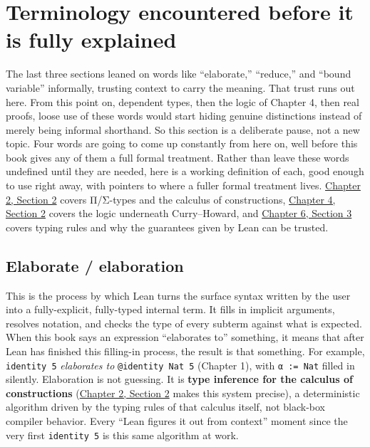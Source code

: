 \section{Terminology encountered before it is fully explained}\label{sec:02-terminology-and-coc:01-terminology:1}

The last three sections leaned on words like ``elaborate,'' ``reduce,'' and ``bound variable'' informally, trusting context to carry the meaning. That trust runs out here. From this point on, dependent types, then the logic of Chapter 4, then real proofs, loose use of these words would start hiding genuine distinctions instead of merely being informal shorthand. So this section is a deliberate pause, not a new topic. Four words are going to come up constantly from here on, well before this book gives any of them a full formal treatment. Rather than leave these words undefined until they are needed, here is a working definition of each, good enough to use right away, with pointers to where a fuller formal treatment lives. \hyperref[sec:02-terminology-and-coc:02-pi-sigma-and-coc:1]{Chapter 2, Section 2} covers Π/Σ-types and the calculus of constructions, \hyperref[sec:04-propositions-and-proofs:02-logic-recap:1]{Chapter 4, Section 2} covers the logic underneath Curry--Howard, and \hyperref[sec:06-rigor-check:03-typing-rules-and-safety:1]{Chapter 6, Section 3} covers typing rules and why the guarantees given by Lean can be trusted.

\subsection{Elaborate / elaboration}\label{sec:02-terminology-and-coc:01-terminology:2}

This is the process by which Lean turns the surface syntax written by the user into a fully-explicit, fully-typed internal term. It fills in implicit arguments, resolves notation, and checks the type of every subterm against what is expected. When this book says an expression ``elaborates to'' something, it means that after Lean has finished this filling-in process, the result is that something. For example, \texttt{identity 5} \emph{elaborates to} \texttt{@identity Nat 5} (Chapter 1), with \texttt{α := Nat} filled in silently. Elaboration is not guessing. It is \textbf{type inference for the calculus of constructions} (\hyperref[sec:02-terminology-and-coc:02-pi-sigma-and-coc:1]{Chapter 2, Section 2} makes this system precise), a deterministic algorithm driven by the typing rules of that calculus itself, not black-box compiler behavior. Every ``Lean figures it out from context'' moment since the very first \texttt{identity 5} is this same algorithm at work.

